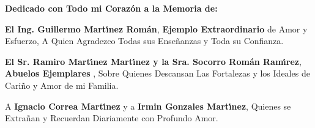 
\thispagestyle{empty}
\vspace*{3mm}
\begin{itshape}
 \begin{flushright}

\large\textbf{Dedicado con Todo mi Coraz\'on a la Memoria de:}

\normalsize

\bigskip\bigskip

\textbf{El Ing. Guillermo Mart\'{\i}nez Rom\'an}, \textbf{Ejemplo Extraordinario} 
de Amor y Esfuerzo, A Quien Agradezco Todas sus Ense\~nanzas y Toda su Confianza.

\textbf{El Sr. Ramiro Mart\'{\i}nez Mart\'{\i}nez y la Sra. Socorro Rom\'an Ram\'{\i}rez}, \textbf{Abuelos Ejemplares} , Sobre Quienes Descansan Las Fortalezas y los Ideales de Cari\~no y Amor de mi Familia.

A \textbf{Ignacio Correa Mart\'{\i}nez} y a \textbf{Irmin Gonzales Mart\'{\i}nez}, Quienes se Extra\~nan y Recuerdan Diariamente con Profundo Amor.
\end{flushright}
\end{itshape}

